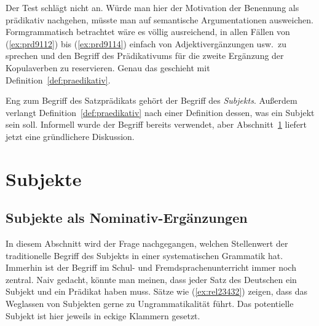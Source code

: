 Der Test schlägt nicht an.
Würde man hier der Motivation der Benennung als prädikativ nachgehen, müsste man auf semantische Argumentationen ausweichen.
Formgrammatisch betrachtet wäre es völlig ausreichend, in allen Fällen von (\ref{ex:prd9112}) bis (\ref{ex:prd9114}) einfach von Adjektivergänzungen usw.\ zu sprechen und den Begriff des Prädikativums für die zweite Ergänzung der Kopulaverben zu reservieren.
Genau das geschieht mit Definition~\ref{def:praedikativ}.


Eng zum Begriff des Satzprädikats gehört der Begriff des \textit{Subjekts}.
Außerdem verlangt Definition~\ref{def:praedikativ} nach einer Definition dessen, was ein Subjekt sein soll.
Informell wurde der Begriff bereits verwendet, aber Abschnitt~\ref{sec:subjekt} liefert jetzt eine gründlichere Diskussion.




\section{Subjekte}

\label{sec:subjekt}

\subsection{Subjekte als Nominativ-Ergänzungen}


In diesem Abschnitt wird der Frage nachgegangen, welchen Stellenwert der traditionelle Begriff des Subjekts in einer systematischen Grammatik hat.
Immerhin ist der Begriff im Schul- und Fremdsprachenunterricht immer noch zentral.
Naiv gedacht, könnte man meinen, dass jeder Satz des Deutschen ein Subjekt und ein Prädikat haben muss.
Sätze wie (\ref{ex:rel23432}) zeigen, dass das Weglassen von Subjekten gerne zu Ungrammatikalität führt.
Das potentielle Subjekt ist hier jeweils in eckige Klammern gesetzt.

